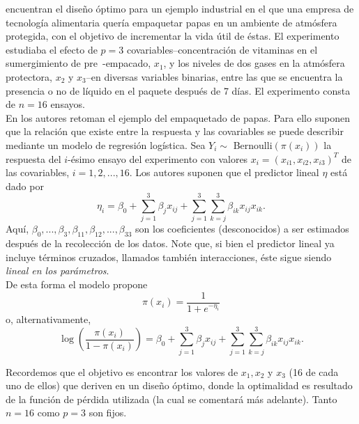 \cite{Woods_etal_2006} encuentran el diseño óptimo para un ejemplo industrial en el que una empresa de tecnología alimentaria quería empaquetar papas en un ambiente de atmósfera protegida, con el objetivo de incrementar la vida útil de éstas. El experimento estudiaba el efecto de $p=3$ covariables--concentración de vitaminas en el sumergimiento de pre~-empacado, $x_1$, y los niveles de dos gases en la atmósfera protectora, $x_2$ y $x_3$--en diversas variables binarias, entre las que se encuentra la presencia o no de líquido en el paquete después de 7 días. El experimento consta de $n=16$ ensayos.\\


En \citep{Woods_etal} los autores retoman el ejemplo del empaquetado de papas. Para ello suponen que la relación que existe entre la respuesta y las covariables se puede describir mediante un modelo de regresión logística. Sea $Y_i \sim$ Bernoulli$(\pi(x_i))$ la respuesta del $i$-ésimo ensayo del experimento con valores $x_i = (x_{i1}, x_{i2}, x_{i3})^T$ de las covariables, $i=1,2,...,16$. Los autores suponen que el predictor lineal $\eta$ está dado por
\begin{equation}
	\eta_i = \beta_0 + \sum_{j=1}^{3} \beta_j x_{ij} + \sum_{j=1}^{3} \sum_{k=j}^{3} \beta_{ik} x_{ij} x_{ik}.
\end{equation}
Aquí, $\beta_0, ..., \beta_3, \beta_{11}, \beta_{12}, ..., \beta_{33}$ son los coeficientes (desconocidos) a ser estimados después de la recolección de los datos. Note que, si bien el predictor lineal ya incluye términos cruzados, llamados también interacciones, éste sigue siendo \textit{lineal en los parámetros}. \\

De esta forma el modelo propone
\begin{equation}
	\pi(x_i) = \frac{1}{1 + e^{-\eta_i}}
\end{equation}
o, alternativamente,
\begin{equation} \label{eq:mod1_logistic_regression1}
	\log \left( \frac{ \pi(x_i) }{ 1 - \pi(x_i) } \right) = \beta_0 + \sum_{j=1}^{3} \beta_j x_{ij} + \sum_{j=1}^{3} \sum_{k=j}^{3} \beta_{ik} x_{ij} x_{ik}.
\end{equation}

Recordemos que el objetivo es encontrar los valores de $x_1, x_2$ y $x_3$ (16 de cada uno de ellos) que deriven en un diseño óptimo, donde la optimalidad es resultado de la función de pérdida utilizada (la cual se comentará más adelante). Tanto $n=16$ como $p=3$ son fijos. \\

